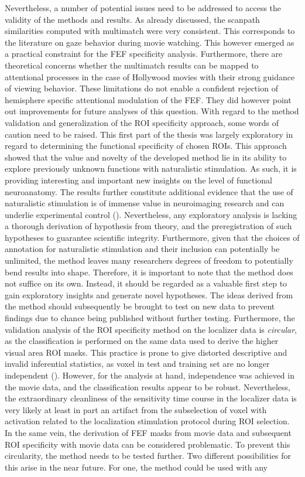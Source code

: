 \documentclass[a4paper, 12pt]{scrreprt}
\begin{document}
Nevertheless, a number of potential issues need to be addressed to access the validity of the methods and results. As already discussed, the scanpath similarities computed with multimatch were very consistent. This corresponds to the literature on gaze behavior during movie watching. This however emerged as a practical constraint for the FEF specificity analysis. Furthermore, there are theoretical concerns whether the multimatch results can be mapped to attentional processes in the case of Hollywood movies with their strong guidance of viewing behavior. These limitations do not enable a confident rejection of hemisphere specific attentional modulation of the FEF. They did however point out improvements for future analyses of this question. With regard to the method validation and generalization of the ROI specificity approach, some words of caution need to be raised. This first part of the thesis was largely exploratory in regard to determining the functional specificity of chosen ROIs. This approach showed that the value and novelty of the developed method lie in its ability to explore previously unknown functions with naturalistic stimulation. As such, it is providing interesting and important new insights on the level of functional neuroanatomy. The results further constitute additional evidence that the use of naturalistic stimulation is of immense value in neuroimaging research and can underlie experimental control (\cite{hasson2004intersubject}). Nevertheless, any exploratory analysis is lacking a thorough derivation of hypothesis from theory, and the preregistration of such hypotheses to guarantee scientific integrity. Furthermore, given that the choices of annotation for naturalistic stimulation and their inclusion can potentially be unlimited, the method leaves many researchers degrees of freedom to potentially bend results into shape. Therefore, it is important to note that the method does not suffice on its own. Instead, it should be regarded as a valuable first step to gain exploratory insights and generate novel hypotheses. The ideas derived from the method should subsequently be brought to test on new data to prevent findings due to chance being published without further testing. Furthermore, the validation analysis of the ROI specificity method on the localizer data is \textit{circular}, as the classification is performed on the same data used to derive the higher visual area ROI masks. This practice is prone to give distorted descriptive and invalid inferential statistics, as voxel in test and training set are no longer independent (\cite{kriegeskorte2009circular}). However, for the analysis at hand, independence was achieved in the movie data, and the classification results appear to be robust. Nevertheless, the extraordinary cleanliness of the sensitivity time course in the localizer data is very likely at least in part an artifact from the subselection of voxel with activation related to the localization stimulation protocol during ROI selection. In the same vein, the derivation of FEF masks from movie data and subsequent ROI specificity with movie data can be considered problematic. To prevent this circularity, the method needs to be tested further. Two different possibilities for this arise in the near future. For one, the method could be used with any 
\end{document}
